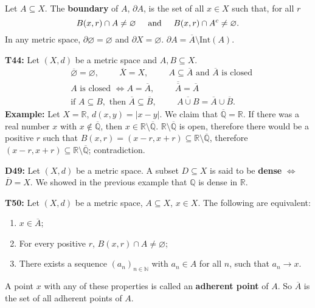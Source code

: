 \documentclass[twocolumn,10pt]{article}
\begin{document}
Let $A\subseteq X$. The \textbf{boundary} of $A$, $\partial A$, is the set of all $x\in X$ such that, for all $r$
\begin{equation*}
    B(x,r) \cap A \neq \varnothing \hspace{0.5cm}\text{and}\hspace{0.5cm} B(x,r)\cap A^c\neq\varnothing.
\end{equation*}
In any metric space, $\partial\varnothing=\varnothing$ and $\partial X=\varnothing$. $\partial A=\overline{A}\setminus\text{Int}(A)$.

\textbf{T44:} Let $(X,d)$ be a metric space and $A,B\subseteq X$.
\begin{align*}
    &\overline{\varnothing} = \varnothing, \hspace{1cm} \overline{X}=X, \hspace{1cm} A\subseteq\overline{A} \text{ and } \overline{A} \text{ is closed}\\
    &A \text{ is closed } \Leftrightarrow A=\overline{A}, \hspace{1cm} \overline{\overline{A}} = \overline{A}\\
    &\text{if } A\subseteq B, \text{ then } \overline{A}\subseteq\overline{B}, \hspace{1cm} \overline{A\cup B}=\overline{A}\cup\overline{B}.
\end{align*}
\color{red}
\textbf{Example:} Let $X=\mathbb{R}$, $d(x,y)=|x-y|$. We claim that $\overline{\mathbb{Q}}=\mathbb{R}$. If there was a real number $x$ with $x\not\in\overline{\mathbb{Q}}$, then $x\in\mathbb{R}\setminus\overline{\mathbb{Q}}$. $\mathbb{R}\setminus\overline{\mathbb{Q}}$ is open, therefore there would be a positive $r$ such that $B(x,r)=(x-r,x+r)\subseteq\mathbb{R}\setminus\overline{\mathbb{Q}}$, therefore $(x-r,x+r)\subseteq\mathbb{R} \setminus\overline{\mathbb{Q}}$; contradiction.
\color{black}

\textbf{D49:} Let $(X,d)$ be a metric space. A subset $D\subseteq X$ is said to be \textbf{dense} $\Leftrightarrow$ $\overline{D}=X$. We showed in the previous example that $\mathbb{Q}$ is dense in $\mathbb{R}$.

\textbf{T50:} Let $(X,d)$ be a metric space, $A\subseteq X$, $x\in X$. The following are equivalent:
\begin{enumerate}
    \item $x\in\overline{A}$;
    \item For every positive $r$, $B(x,r)\cap A\neq\varnothing$;
    \item There exists a sequence $(a_n)_{n\in\mathbb{N}}$ with $a_n\in A$ for all $n$, such that $a_n\to x$.
\end{enumerate}
A point $x$ with any of these properties is called an \textbf{adherent point} of $A$. So $\overline{A}$ is the set of all adherent points of $A$.
\end{document}
